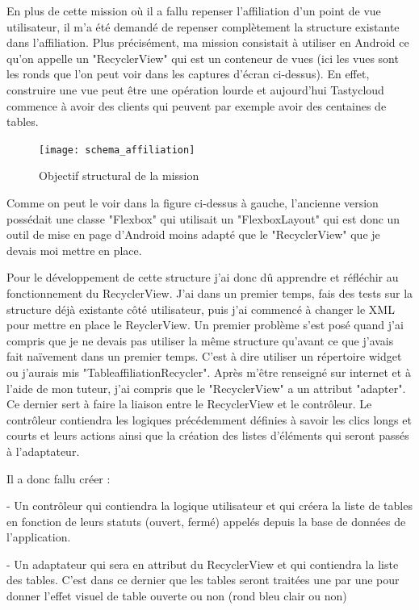 En plus de cette mission où il a fallu repenser l'affiliation d'un point de vue utilisateur, il m'a été demandé de repenser complètement la structure existante dans l'affiliation. Plus précisément, ma mission consistait à utiliser en Android ce qu'on appelle un "RecyclerView" qui est un conteneur de vues (ici les vues sont les ronds que l'on peut voir dans les captures d'écran ci-dessus). En effet, construire une vue peut être une opération lourde et aujourd'hui Tastycloud commence à avoir des clients qui peuvent par exemple avoir des centaines de tables.

\begin{figure}[!htb]
  \centering
  \texttt{[image: schema\_affiliation]}
  \caption{Objectif structural de la mission}
  \label{fig:boat1}
\end{figure}

Comme on peut le voir dans la figure ci-dessus à gauche, l'ancienne version possédait une classe "Flexbox" qui utilisait un "FlexboxLayout" qui est donc un outil de mise en page d'Android moins adapté que le "RecyclerView" que je devais moi mettre en place.


Pour le développement de cette structure j'ai donc dû apprendre et réfléchir au fonctionnement du RecyclerView. J'ai dans un premier temps, fais des tests sur la structure déjà existante côté utilisateur, puis j'ai commencé à changer le XML pour mettre en place le ReyclerView. Un premier problème s'est posé quand j'ai compris que je ne devais pas utiliser la même structure qu'avant ce que j'avais fait naïvement dans un premier temps. C'est à dire utiliser un répertoire widget ou j'aurais mis "TableaffiliationRecycler". Après m'être renseigné sur internet et à l'aide de mon tuteur, j'ai compris que le "RecyclerView" a un attribut "adapter". Ce dernier sert à faire la liaison entre le RecyclerView et le contrôleur. Le contrôleur contiendra les logiques précédemment définies à savoir les clics longs et courts et leurs actions ainsi que la création des listes d'éléments qui seront passés à l'adaptateur.

Il a donc fallu créer : 

- Un contrôleur qui contiendra la logique utilisateur et qui créera la liste de tables en fonction de leurs statuts (ouvert, fermé) appelés depuis la base de données de l'application.

- Un adaptateur qui sera en attribut du RecyclerView et qui contiendra la liste des tables.  C'est dans ce dernier que les tables seront traitées une par une pour donner l'effet visuel de table ouverte ou non (rond bleu clair ou non)

